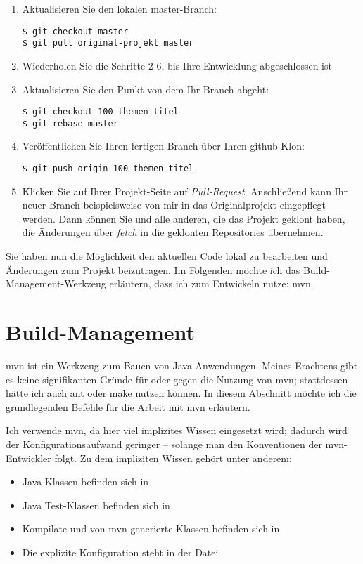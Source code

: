 \begin{enumerate}
\item Aktualisieren Sie den lokalen master-Branch:
\begin{verbatim}
$ git checkout master
$ git pull original-projekt master
\end{verbatim}

\item Wiederholen Sie die Schritte 2-6, bis Ihre Entwicklung abgeschlossen ist

\item Aktualisieren Sie den Punkt von dem Ihr Branch abgeht:
\begin{verbatim}
$ git checkout 100-themen-titel
$ git rebase master
\end{verbatim}

\item Veröffentlichen Sie Ihren fertigen Branch über Ihren github-Klon:
\begin{verbatim}
$ git push origin 100-themen-titel
\end{verbatim}

\item Klicken Sie auf Ihrer Projekt-Seite auf \emph{Pull-Request}. Anschließend kann Ihr neuer Branch beispielsweise von mir in das Originalprojekt eingepflegt werden. Dann können Sie und alle anderen, die das Projekt geklont haben, die Änderungen über \emph{fetch} in die geklonten Repositories übernehmen.
\end{enumerate}

Sie haben nun die Möglichkeit den aktuellen Code lokal zu bearbeiten und Änderungen zum Projekt beizutragen. Im Folgenden möchte ich das Build-Management-Werkzeug erläutern, dass ich zum Entwickeln nutze: \gls{mvn}.

\section{Build-Management}
\gls{mvn} ist ein Werkzeug zum Bauen von Java-Anwendungen. Meines Erachtens gibt es keine signifikanten Gründe für oder gegen die Nutzung von \gls{mvn}; stattdessen hätte ich auch \gls{ant} oder \gls{make} nutzen können. In diesem Abschnitt möchte ich die grundlegenden Befehle für die Arbeit mit \gls{mvn} erläutern.

Ich verwende \gls{mvn}, da hier viel implizites Wissen eingesetzt wird; dadurch wird der Konfigurationsaufwand geringer -- solange man den Konventionen der \gls{mvn}-Entwickler folgt. Zu dem impliziten Wissen gehört unter anderem:
\begin{itemize}
\item Java-Klassen befinden sich in 
\item Java Test-Klassen befinden sich in 
\item Kompilate und von \gls{mvn} generierte Klassen befinden sich in 
\item Die explizite Konfiguration steht in der Datei 
\end{itemize}

